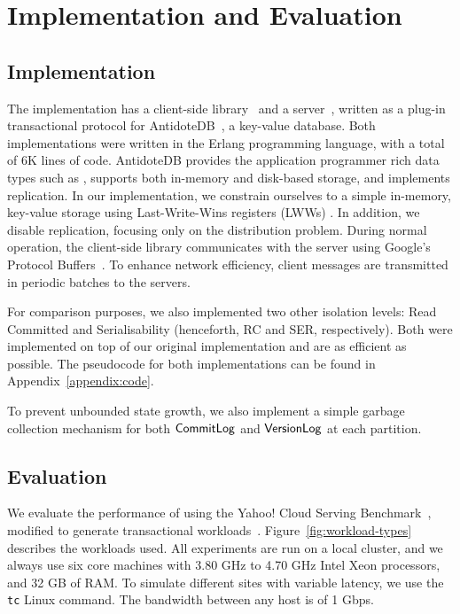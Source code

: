 \cleardoublepage
\chapter{Implementation and Evaluation}
\label{eval_chapter}

\section{Implementation}

The  implementation has a client-side library~\citep{pvc-client} and a server~\citep{pvc-server}, written as a plug-in transactional protocol for AntidoteDB~\citep{antidote-db}, a key-value database. Both implementations were written in the Erlang programming language, with a total of 6K lines of code. AntidoteDB provides the application programmer rich data types such as , supports both in-memory and disk-based storage, and implements  replication. In our implementation, we constrain ourselves to a simple in-memory, key-value storage using Last-Write-Wins registers (LWWs) . In addition, we disable replication, focusing only on the distribution problem. During normal operation, the client-side library communicates with the server using Google's Protocol Buffers~\citep{protobuf}. To enhance network efficiency, client messages are transmitted in periodic batches to the servers.


For comparison purposes, we also implemented two other isolation levels: Read Committed and Serialisability (henceforth, RC and SER, respectively). Both were implemented on top of our original implementation and are as efficient as possible. The pseudocode for both implementations can be found in Appendix~\ref{appendix:code}.

To prevent unbounded state growth, we also implement a simple garbage collection mechanism for both $\mathsf{CommitLog}$ and $\mathsf{VersionLog}$ at each partition.

\section{Evaluation}

We evaluate the performance of  using the Yahoo! Cloud Serving Benchmark~\citep{ycsb}, modified to generate transactional workloads~\citep{ardekani_nmsi}. Figure~\ref{fig:workload-types} describes the workloads used. All experiments are run on a local cluster, and we always use six core machines with 3.80 GHz to 4.70 GHz Intel Xeon processors, and 32 GB of RAM. To simulate different sites with variable latency, we use the \texttt{tc} Linux command. The bandwidth between any host is of 1 Gbps.

